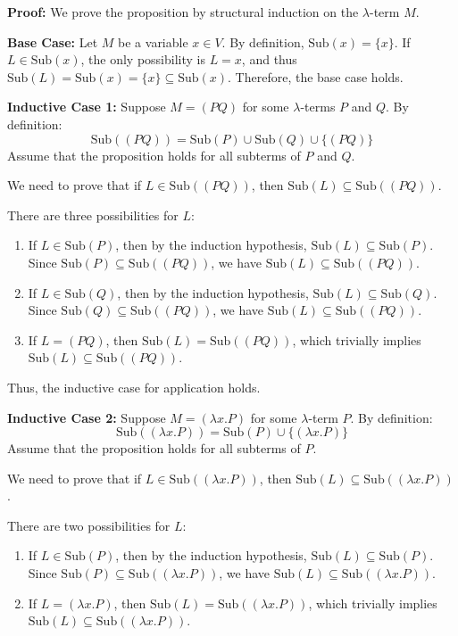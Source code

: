 \documentclass{article}
\begin{document}
\bigskip

\noindent \textbf{Proof:} We prove the proposition by structural induction on the $\lambda$-term $M$.

\medskip

\noindent \textbf{Base Case:} Let $M$ be a variable $x \in V$. By definition, $\text{Sub}(x) = \{x\}$. If $L \in \text{Sub}(x)$, the only possibility is $L = x$, and thus $\text{Sub}(L) = \text{Sub}(x) = \{x\} \subseteq \text{Sub}(x)$. Therefore, the base case holds.

\medskip

\noindent \textbf{Inductive Case 1:} Suppose $M = (PQ)$ for some $\lambda$-terms $P$ and $Q$. By definition:
\[
\text{Sub}((PQ)) = \text{Sub}(P) \cup \text{Sub}(Q) \cup \{(PQ)\}
\]
Assume that the proposition holds for all subterms of $P$ and $Q$.

We need to prove that if $L \in \text{Sub}((PQ))$, then $\text{Sub}(L) \subseteq \text{Sub}((PQ))$.

There are three possibilities for $L$:
\begin{enumerate}
    \item If $L \in \text{Sub}(P)$, then by the induction hypothesis, $\text{Sub}(L) \subseteq \text{Sub}(P)$. Since $\text{Sub}(P) \subseteq \text{Sub}((PQ))$, we have $\text{Sub}(L) \subseteq \text{Sub}((PQ))$.
    \item If $L \in \text{Sub}(Q)$, then by the induction hypothesis, $\text{Sub}(L) \subseteq \text{Sub}(Q)$. Since $\text{Sub}(Q) \subseteq \text{Sub}((PQ))$, we have $\text{Sub}(L) \subseteq \text{Sub}((PQ))$.
    \item If $L = (PQ)$, then $\text{Sub}(L) = \text{Sub}((PQ))$, which trivially implies $\text{Sub}(L) \subseteq \text{Sub}((PQ))$.
\end{enumerate}

Thus, the inductive case for application holds.

\medskip

\noindent \textbf{Inductive Case 2:} Suppose $M = (\lambda x . P)$ for some $\lambda$-term $P$. By definition:
\[
\text{Sub}((\lambda x . P)) = \text{Sub}(P) \cup \{(\lambda x . P)\}
\]
Assume that the proposition holds for all subterms of $P$.

We need to prove that if $L \in \text{Sub}((\lambda x . P))$, then $\text{Sub}(L) \subseteq \text{Sub}((\lambda x . P))$.

There are two possibilities for $L$:
\begin{enumerate}
    \item If $L \in \text{Sub}(P)$, then by the induction hypothesis, $\text{Sub}(L) \subseteq \text{Sub}(P)$. Since $\text{Sub}(P) \subseteq \text{Sub}((\lambda x . P))$, we have $\text{Sub}(L) \subseteq \text{Sub}((\lambda x . P))$.
    \item If $L = (\lambda x . P)$, then $\text{Sub}(L) = \text{Sub}((\lambda x . P))$, which trivially implies $\text{Sub}(L) \subseteq \text{Sub}((\lambda x . P))$.
\end{enumerate}
\end{document}
